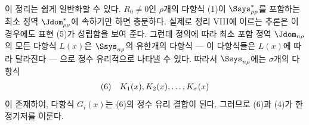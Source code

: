 
이 정리는 쉽게 일반화할 수 있다. $R_0\ne0$인 $\rho$개의 다항식 (1)이 $\Ssys^*_{\rho\rho}$를 포함하는 최소 정역 $\Jdom^*_{\rho\rho}$에 속하기만 하면 충분하다. 실제로 정리 VIII에 이르는 추론은 이 경우에도 표현 (5)가 성립함을 보여 준다. 그런데 정의에 따라 최소 포함 정역 $\Jdom_{n\rho}$의 모든 다항식 $L(x)$은 $\Ssys_{n\rho}$의 유한개의 다항식 --- 이 다항식들은 $L(x)$에 따라 달라진다 --- 으로 정수 유리적으로 나타낼 수 있다. 따라서 $\Ssys_{n\rho}$에는 $\sigma$개의 다항식
\[
\begin{array}{@{}l@{\quad}c@{}}
(6)& K_1(x),K_2(x),\ldots,K_\sigma(x)
\end{array}
\]
이 존재하여, 다항식 $G_i(x)$는 (6)의 정수 유리 결합이 된다. 그러므로 (6)과 (4)가 한 정기저를 이룬다.
